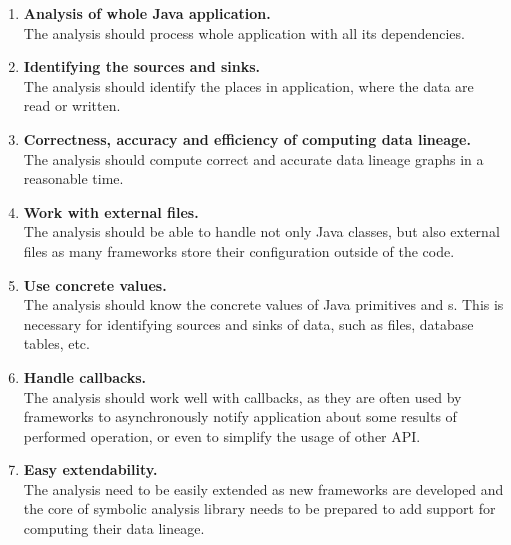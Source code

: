 \begin{enumerate}
  \item \textbf{Analysis of whole Java application.} \\
    The analysis should process whole application with all its dependencies.
  \item \textbf{Identifying the sources and sinks.} \\
    The analysis should identify the places in application, where the data
    are read or written.
  \item \textbf{Correctness, accuracy and efficiency of computing data lineage.} \\
    The analysis should compute correct and accurate data lineage graphs in a reasonable time.
  \item \textbf{Work with external files.} \\
    The analysis should be able to handle not only Java classes,
    but also external files as many frameworks store their configuration
    outside of the code.
  \item \textbf{Use concrete values.} \\
    The analysis should know the concrete values of Java primitives and s.
    This is necessary for identifying sources and sinks of data,
    such as files, database tables, etc.
  \item \textbf{Handle callbacks.} \\
    The analysis should work well with callbacks, as they are often
    used by frameworks to asynchronously notify application
    about some results of performed operation, or even
    to simplify the usage of other API.
  \item \textbf{Easy extendability.} \\
    The analysis need to be easily extended as new frameworks are developed
    and the core of symbolic analysis library needs to be prepared to add support for computing their data lineage.
\end{enumerate}



